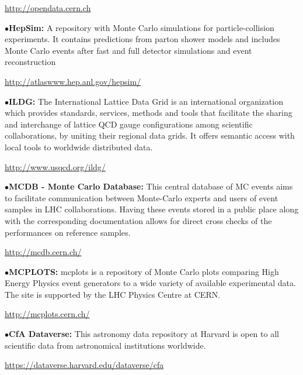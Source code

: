 	\item{}\qquad\url{http://opendata.cern.ch}
\medskip

\item{$\bullet$}{\bf HepSim:}
A repository with Monte Carlo simulations for particle-collision experiments. It contains predictions from parton shower models and includes Monte Carlo events after fast and full detector simulations and event reconstruction
	\item{}\qquad\url{http://atlaswww.hep.anl.gov/hepsim/}

\medskip

\item{$\bullet$}{\bf ILDG:}
The International Lattice Data Grid is an international organization which provides standards, services, methods and tools that facilitate the sharing and interchange of lattice QCD gauge configurations among scientific collaborations, by uniting their regional data grids. It offers semantic access with local tools to worldwide distributed data.
	\item{}\qquad\url{http://www.usqcd.org/ildg/}

\medskip

\item{$\bullet$}{\bf MCDB - Monte Carlo Database:}
This central database of MC events aims to facilitate communication between Monte-Carlo experts and users of event samples in LHC collaborations. Having these events stored in a public place along with the corresponding documentation allows for direct cross checks of the performances on reference samples.
	\item{}\qquad\url{http://mcdb.cern.ch/}

\medskip

\item{$\bullet$}{\bf MCPLOTS:}
mcplots is a repository of Monte Carlo plots comparing High Energy Physics event generators to a wide variety of available experimental data. The site is supported by the LHC Physics Centre at CERN.
	\item{}\qquad\url{http://mcplots.cern.ch/}

\medskip



\item{$\bullet$}{\bf CfA Dataverse:}
This astronomy data repository at Harvard is open to all scientific data from astronomical institutions worldwide.
	\item{}\qquad\url{https://dataverse.harvard.edu/dataverse/cfa}


